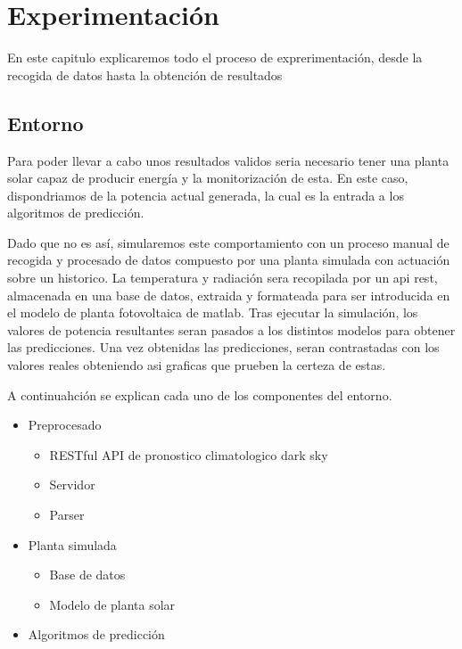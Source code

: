 \chapter{Experimentación}

\graphicspath{ {./graphs/} }

En este capitulo explicaremos todo el proceso de exprerimentación, desde la recogida de datos hasta la obtención de resultados


\section{Entorno}
Para poder llevar a cabo unos resultados validos seria necesario tener una planta solar capaz de producir energía y la monitorización de esta. En este caso, dispondriamos de la potencia actual generada, la cual es la entrada a los algoritmos de predicción. 

Dado que no es así, simularemos este comportamiento con un proceso manual de recogida y procesado de datos compuesto por una planta simulada con actuación sobre un historico.
La temperatura y radiación sera recopilada por un api rest, almacenada en una base de datos, extraida y formateada para ser introducida en el modelo de planta fotovoltaica de matlab.
Tras ejecutar la simulación, los valores de potencia resultantes seran pasados a los distintos modelos para obtener las predicciones.
Una vez obtenidas las predicciones, seran contrastadas con los valores reales obteniendo asi graficas que prueben la certeza de estas.

A continuahción se explican cada uno de los componentes del entorno.

\begin{itemize}
    \item Preprocesado
    \begin{itemize}
        \item RESTful API de pronostico climatologico dark sky
        \item Servidor
        \item Parser
    \end{itemize}
    \item Planta simulada
    \begin{itemize}
        \item Base de datos
        \item Modelo de planta solar
    \end{itemize}
    \item Algoritmos de predicción
\end{itemize}


